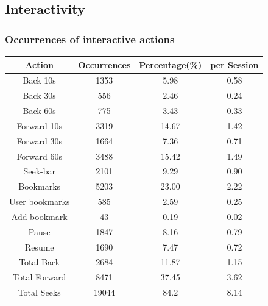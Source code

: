\documentclass[xcolor=pdftex,dvipsnames,table]{beamer}
\begin{document}
\subsection{Interactivity}

\begin{frame}
    \frametitle{Occurrences of interactive actions}

    {\small
    \begin{tabular}{|c|c|c|c|}
        \hline
        Action & Occurrences & Percentage(\%) & per Session\\
        \hline

        Back 10s        & 1353 & 5.98  & 0.58 \\
        Back 30s        & 556  & 2.46  & 0.24 \\
        Back 60s        & 775  & 3.43  & 0.33 \\
        Forward 10s     & 3319 & 14.67 & 1.42 \\
        Forward 30s     & 1664 & 7.36  & 0.71 \\
        Forward 60s     & 3488 & 15.42 & 1.49 \\
        Seek-bar        & 2101 & 9.29  & 0.90 \\
        Bookmarks       & 5203 & 23.00 & 2.22 \\
        User bookmarks  & 585  & 2.59  & 0.25 \\

        Add bookmark    & 43   & 0.19  & 0.02 \\
        Pause           & 1847 & 8.16  & 0.79 \\ %
        Resume          & 1690 & 7.47  & 0.72 \\ %

        \hline\hline

        Total Back     & 2684 & 11.87 & 1.15 \\
        Total Forward  & 8471 & 37.45 & 3.62 \\
        Total Seeks    & 19044 & 84.2 & 8.14 \\

        \hline
        \end{tabular}
    }

\end{frame}
\end{document}
